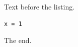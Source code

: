 \documentclass{article}
\begin{document}
Text before the listing.
\begin{lstlisting}[caption={Short}]
x = 1
\end{lstlisting}
The end.
\end{document}
